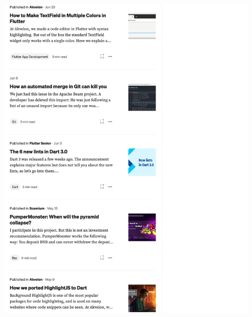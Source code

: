 \Continuing
\begin{center}
    \includegraphics[width=40em]{medium-articles-p5}
\end{center}
\WillContinue
\pagebreak


